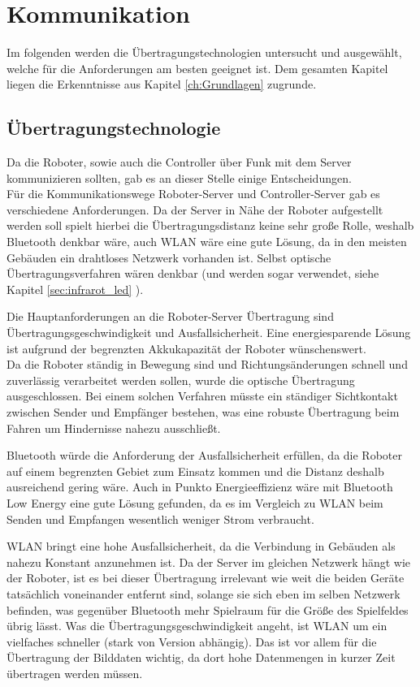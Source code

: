 \chapter{Kommunikation}
\label{sec:kommunikation}

Im folgenden werden die Übertragungstechnologien untersucht und ausgewählt, welche für die Anforderungen am besten geeignet ist. Dem gesamten Kapitel liegen die Erkenntnisse aus Kapitel \ref{ch:Grundlagen} zugrunde.

\section{Übertragungstechnologie}
Da die Roboter, sowie auch die Controller über Funk mit dem Server kommunizieren sollten, gab es an dieser Stelle einige Entscheidungen. \\
Für die Kommunikationswege Roboter-Server und Controller-Server gab es verschiedene Anforderungen. 
Da der Server in Nähe der Roboter aufgestellt werden soll spielt hierbei die Übertragungsdistanz keine sehr große Rolle, weshalb Bluetooth denkbar wäre, auch WLAN wäre eine gute Lösung, da in den meisten Gebäuden ein drahtloses Netzwerk vorhanden ist. Selbst optische Übertragungsverfahren wären denkbar (und werden sogar verwendet, siehe Kapitel \ref{sec:infrarot_led}
).

Die Hauptanforderungen an die Roboter-Server Übertragung sind Übertragungsgeschwindigkeit und Ausfallsicherheit. Eine energiesparende Lösung ist aufgrund der begrenzten Akkukapazität der Roboter wünschenswert. \\
Da die Roboter ständig in Bewegung sind und Richtungsänderungen schnell und zuverlässig verarbeitet werden sollen, wurde die optische Übertragung ausgeschlossen. Bei einem solchen Verfahren müsste ein ständiger Sichtkontakt zwischen Sender und Empfänger bestehen, was eine robuste Übertragung beim Fahren um Hindernisse nahezu ausschließt. 

Bluetooth würde die Anforderung der Ausfallsicherheit erfüllen, da die Roboter auf einem begrenzten Gebiet zum Einsatz kommen und die Distanz deshalb ausreichend gering wäre. Auch in Punkto Energieeffizienz wäre mit Bluetooth Low Energy eine gute Lösung gefunden, da es im Vergleich zu WLAN beim Senden und Empfangen wesentlich weniger Strom verbraucht. 

WLAN bringt eine hohe Ausfallsicherheit, da die Verbindung in Gebäuden als nahezu Konstant anzunehmen ist. Da der Server im gleichen Netzwerk hängt wie der Roboter, ist es bei dieser Übertragung irrelevant wie weit die beiden Geräte tatsächlich voneinander entfernt sind, solange sie sich eben im selben Netzwerk befinden, was gegenüber Bluetooth mehr Spielraum für die Größe des Spielfeldes übrig lässt. Was die Übertragungsgeschwindigkeit angeht, ist WLAN um ein vielfaches schneller (stark von Version abhängig). Das ist vor allem für die Übertragung der Bilddaten wichtig, da dort hohe Datenmengen in kurzer Zeit übertragen werden müssen. \\

